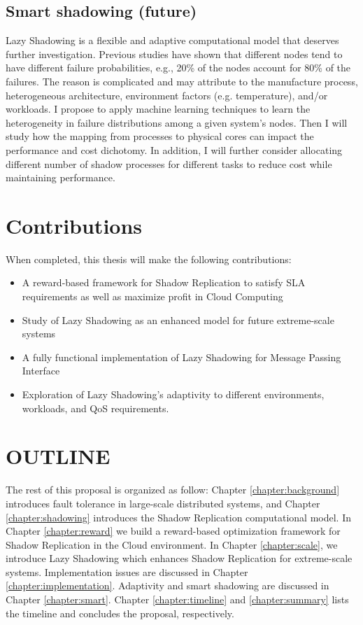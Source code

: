 \subsection{Smart shadowing (future)}
Lazy Shadowing is a flexible and adaptive computational model that deserves further investigation. Previous studies have shown that 
different nodes tend to have different failure probabilities, e.g., 20\% of the nodes account for 80\% of the failures. The reason 
is complicated and may attribute to the manufacture process, heterogeneous architecture, environment factors (e.g. temperature), 
and/or workloads. I propose to apply machine learning techniques to learn the heterogeneity in failure distributions among a given 
system's nodes. Then I will study how the mapping from processes to physical cores can impact the performance and cost dichotomy. 
In addition, I will further consider allocating different number of shadow processes for different tasks to reduce cost while 
maintaining performance. 

\section{Contributions}
When completed, this thesis will make the following contributions:

\begin{itemize}
\item A reward-based framework for Shadow Replication to satisfy SLA requirements as well as maximize profit in Cloud Computing
\item Study of Lazy Shadowing as an enhanced model for future extreme-scale systems
\item A fully functional implementation of Lazy Shadowing for Message Passing Interface
\item Exploration of Lazy Shadowing's adaptivity to different environments, workloads, and QoS requirements. 
\end{itemize}


\section{OUTLINE}
\label{outline}
The rest of this proposal is organized as follow:  
Chapter \ref{chapter:background} introduces fault tolerance in large-scale distributed systems, 
and Chapter \ref{chapter:shadowing} introduces the Shadow Replication computational model. In Chapter \ref{chapter:reward} we build a reward-based optimization framework for Shadow Replication in the Cloud environment.
In Chapter \ref{chapter:scale}, we introduce Lazy Shadowing which enhances Shadow Replication for extreme-scale systems. 
Implementation issues are discussed in Chapter \ref{chapter:implementation}. Adaptivity and smart shadowing are discussed in Chapter \ref{chapter:smart}.
Chapter \ref{chapter:timeline} and \ref{chapter:summary} lists the timeline and concludes the proposal, respectively.








